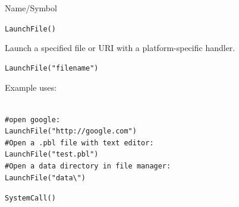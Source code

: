\begin{desc}{Name/Symbol}
\item[Name/Symbol]	\verb+LaunchFile()+

\item[Description]	Launch a specified file or URI with a platform-specific handler.

\item[Usage]
\begin{verbatim}
LaunchFile("filename")
\end{verbatim}

\item[Example]
Example uses:
\begin{verbatim}

#open google:
LaunchFile("http://google.com")    
#Open a .pbl file with text editor:
LaunchFile("test.pbl")             
#Open a data directory in file manager:
LaunchFile("data\")                
\end{verbatim}

\item[See Also] 
  \verb+SystemCall()+

\end{desc}



